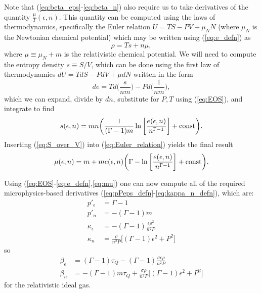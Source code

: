 \documentclass[%
notitlepage,
superscriptaddress,
nofootinbib,
amsmath,
amssymb,
aps,
twocolumn
]{revtex4-1}
\begin{document}
Note that (\ref{eq:beta_eps}-\ref{eq:beta_n}) also require us to take derivatives of the quantity $\frac{\mu}{T}(\epsilon, n)$.  This quantity can be computed using the laws of thermodynamics, specifically the Euler relation ${U = T S - P V + \mu_{N} N}$ (where $\mu_{N}$ is the Newtonian chemical potential)
which may be written using (\ref{eq:e_defn}) as
\begin{equation} \label{eq:Euler_relation}
\rho = T s + n \mu,
\end{equation}
where $\mu \equiv \mu_{N} + m$ is the relativistic chemical potential.  We will need to compute the entropy density $s \equiv S/V$, which can be done using the first law of thermodynamics ${dU = T dS - P dV + \mu dN}$ written in the form 
\begin{equation}
de = T d \Big( \frac{s}{n m} \Big) - P d \Big( \frac{1}{n m} \Big),
\end{equation}
which we can expand, divide by $d n$, substitute for $P, T$ using (\ref{eq:EOS}), and integrate to find
\begin{equation} \label{eq:S_over_V}
s(\epsilon, n) = m n \bigg( \frac{1}{(\Gamma - 1) m} \ln \bigg[ \frac{e(\epsilon, n)}{n^{\Gamma - 1}} \bigg] + \textnormal{const} \bigg).
\end{equation}
Inserting (\ref{eq:S_over_V}) into (\ref{eq:Euler_relation}) yields the final result
\begin{equation} \label{eq:mu}
\mu(\epsilon, n) = m + m e(\epsilon, n) \bigg( \Gamma - \ln \bigg[ \frac{e(\epsilon, n)}{n^{\Gamma - 1}}  \bigg] + \textnormal{const} \bigg).
\end{equation}

Using (\ref{eq:EOS}-\ref{eq:e_defn},\ref{eq:mu}) one can now compute all of the required microphysics-based derivatives (\ref{eq:pPeps_defn}-\ref{eq:kappa_n_defn}), which are:
\begin{align}
p'_{\epsilon} &= \Gamma - 1 \\
p'_{n} &= -(\Gamma - 1) m \\
\kappa_{\epsilon} &= -(\Gamma - 1) \frac{\epsilon \rho^2}{n^2 P} \\
\kappa_{n} &= \frac{\rho}{n^2 P} \big[ (\Gamma - 1) \epsilon^2 + P^2 \big]
\end{align}
so
\begin{align}
\beta_{\epsilon} &= (\Gamma - 1) \tau_{Q} - (\Gamma - 1) \frac{\sigma \epsilon \rho}{n^2 P}\\
\beta_{n} &= -(\Gamma - 1) m \tau_{Q} + \frac{\sigma \rho}{n^3 P} \big[ (\Gamma - 1) \epsilon^2 + P^2 \big] 
\end{align}
for the relativistic ideal gas.  
\end{document}
